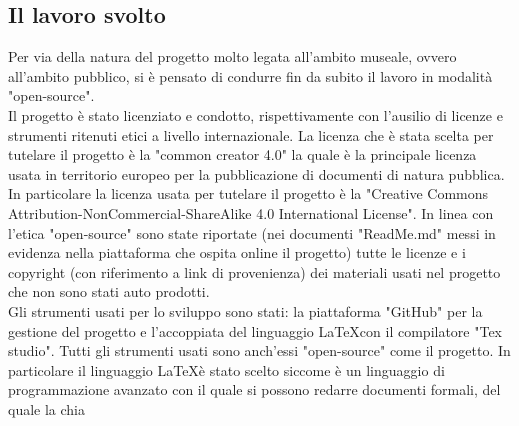 \documentclass[hidelinks,12pt,a4paper]{article}
\begin{document}
\begin{flushleft}
				\subsection{Il lavoro svolto}
				Per via della natura del progetto molto legata all'ambito museale, ovvero all'ambito pubblico, si è pensato di condurre fin da subito il lavoro in modalità "open-source".\\
				Il progetto è stato licenziato e condotto, rispettivamente con l'ausilio di licenze e strumenti ritenuti etici a livello internazionale. La licenza che è stata scelta per tutelare il progetto è la "common creator 4.0" la quale è la principale licenza usata in territorio europeo per la pubblicazione di documenti di natura pubblica. In particolare la licenza usata per tutelare il progetto è la "Creative Commons Attribution-NonCommercial-ShareAlike 4.0 International License". In linea con l'etica "open-source" sono state riportate (nei documenti "ReadMe.md" messi in evidenza nella piattaforma che ospita online il progetto) tutte le licenze e i copyright (con riferimento a link di provenienza) dei materiali usati nel progetto che non sono stati auto prodotti.\\
				Gli strumenti usati per lo sviluppo sono stati: la piattaforma "GitHub" per la gestione del progetto e l'accoppiata del linguaggio \LaTeX con il compilatore "Tex studio". Tutti gli strumenti usati sono anch'essi "open-source" come il progetto. In particolare il linguaggio \LaTeX è stato scelto siccome è un linguaggio di programmazione avanzato con il quale si possono redarre documenti formali, del quale la chia
	\end{flushleft}
\end{document}

